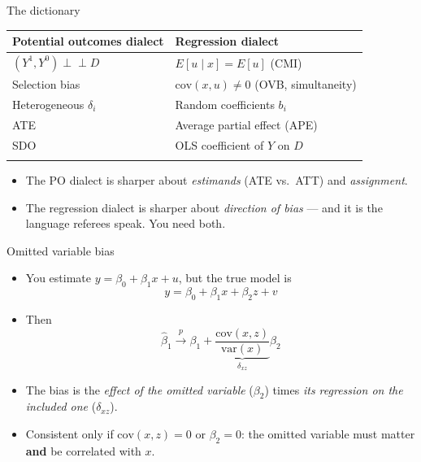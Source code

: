 \documentclass[
  11pt,
  ignorenonframetext,
  aspectratio=169,
]{beamer}
\newcounter{none} %
\providecommand{\tightlist}{%
  \setlength{\itemsep}{0pt}\setlength{\parskip}{0pt}}
\newcommand{\indep}{\perp\!\!\!\perp}
\begin{document}
\begin{frame}{The dictionary}
\protect{}\label{the-dictionary}
{\def\LTcaptype{none} %
\begin{longtable}[]{@{}
  >{\raggedright\arraybackslash}p{}
  >{\raggedright\arraybackslash}p{}@{}}
\toprule\noalign{}
\begin{minipage}[b]{\linewidth}\raggedright
Potential outcomes dialect
\end{minipage} & \begin{minipage}[b]{\linewidth}\raggedright
Regression dialect
\end{minipage} \\
\midrule\noalign{}
\endhead
\((Y^1, Y^0) \indep D\) & \(E[u \mid x] = E[u]\) (CMI) \\
Selection bias & \(\mathrm{cov}(x, u) \neq 0\) (OVB, simultaneity) \\
Heterogeneous \(\delta_i\) & Random coefficients \(b_i\) \\
ATE & Average partial effect (APE) \\
SDO & OLS coefficient of \(Y\) on \(D\) \\
\bottomrule\noalign{}
\end{longtable}
}

\begin{itemize}
\tightlist
\item
  The PO dialect is sharper about \emph{estimands} (ATE vs.~ATT) and
  \emph{assignment}.
\item
  The regression dialect is sharper about \emph{direction of bias} ---
  and it is the language referees speak. You need both.
\end{itemize}
\end{frame}

\begin{frame}{Omitted variable bias}
\protect{}\label{omitted-variable-bias}
\begin{itemize}
\tightlist
\item
  You estimate \(y = \beta_0 + \beta_1 x + u\), but the true model is \[
  y = \beta_0 + \beta_1 x + \beta_2 z + v
  \]
\item
  Then \[
  \hat{\beta}_1 \xrightarrow{p} \beta_1 + \underbrace{\frac{\mathrm{cov}(x, z)}{\mathrm{var}(x)}}_{\delta_{xz}} \beta_2
  \]
\item
  The bias is the \emph{effect of the omitted variable} (\(\beta_2\))
  times \emph{its regression on the included one} (\(\delta_{xz}\)).
\item
  Consistent only if \(\mathrm{cov}(x,z) = 0\) or \(\beta_2 = 0\): the
  omitted variable must matter \textbf{and} be correlated with \(x\).
\end{itemize}
\end{frame}
\end{document}
